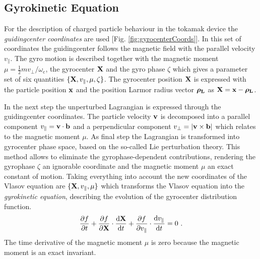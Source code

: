 \newpage

\subsection{Gyrokinetic Equation}
\label{sub:gyrokinetic}
 
For the description of charged particle behaviour in the tokamak device the \textit{guidingcenter coordinates} are used [Fig. \ref{fig:gyrocenterCoords}]. In this set of coordinates the guidingcenter follows the magnetic field with the parallel velocity $v_{\parallel}$. The gyro motion is described together with the magnetic moment $\mu = \frac{1}{2}mv_\perp/\omega_\mathrm{c}$, the gyrocenter $\boldsymbol{\mathbf{X}}$ and the gyro phase $\zeta$ which gives a parameter set of six quantities $\{\boldsymbol{\mathbf{X}}, v_{\parallel}, \mu, \zeta\}$. The gyrocenter position $\boldsymbol{\mathbf{X}}$ is expressed with the particle position $\boldsymbol{\mathbf{x}}$ and the position Larmor radius vector $\boldsymbol{\mathbf{\rho_\mathrm{L}}}$ as $\boldsymbol{\mathbf{X}} = \boldsymbol{\mathbf{x}} - \boldsymbol{\mathbf{\rho_\mathrm{L}}}$.


In the next step the unperturbed Lagrangian is expressed through the guidingcenter coordinates. The particle velocity $\boldsymbol{\mathbf{v}}$ is decomposed into a parallel component $v_\parallel = \boldsymbol{\mathbf{v}} \cdot \boldsymbol{\mathbf{b}}$ and a perpendicular component $v_\perp = |\boldsymbol{\mathbf{v}} \times \boldsymbol{\mathbf{b}}|$ which relates to the magnetic moment $\mu$. As final step the Lagrangian is transformed into gyrocenter phase space, based on the so-called Lie perturbation theory. This method allows to eliminate the gyrophase-dependent contributions, rendering the gyrophase $\zeta$ an ignorable coordinate and the magnetic moment $\mu$ an exact constant of motion. \cite{Garbet2010,Cary1981,Cary1983} 
Taking everything into account the new coordinates of the Vlasov equation are $\{\boldsymbol{\mathbf{X}}, v_{\parallel}, \mu\}$ which transforms the Vlasov equation into the \textit{gyrokinetic equation}, describing the evolution of the gyrocenter distribution function.
\begin{gather}
	\frac{\partial f}{\partial t} + \frac{\partial f}{\partial \boldsymbol{\mathbf{X}}} \cdot \frac{\mathrm{d}\boldsymbol{\mathbf{X}}}{\mathrm{d}t} + \frac{\partial f}{\partial v_\parallel} \cdot \frac{\mathrm{d}v_\parallel}{\mathrm{d}t} = 0~.
	\label{eq:gyrokinetic}
\end{gather}
The time derivative of the magnetic moment $\mu$ is zero because the magnetic moment is an exact invariant. 

